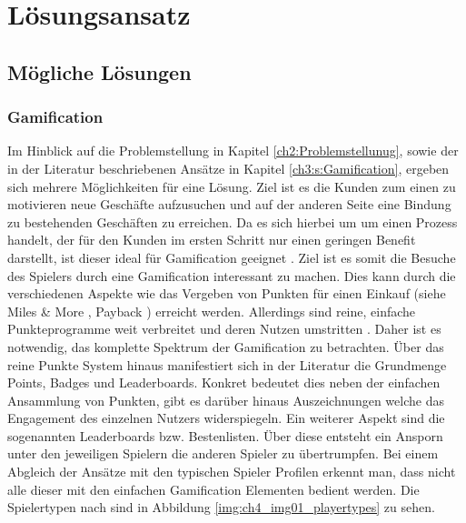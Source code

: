 \chapter{Lösungsansatz}
\label{ch:S4_Lösungsansatz}

\section{Mögliche Lösungen}
\label{ch4:s:Lösungen}

\subsection*{Gamification}


Im Hinblick auf die Problemstellung in Kapitel \ref{ch2:Problemstellunug}, sowie der in der Literatur beschriebenen Ansätze in Kapitel \ref{ch3:s:Gamification}, ergeben sich mehrere Möglichkeiten für eine Lösung. Ziel ist es die Kunden zum einen zu motivieren neue Geschäfte aufzusuchen und auf der anderen Seite eine Bindung zu bestehenden Geschäften zu erreichen. Da es sich hierbei um um einen Prozess handelt, der für den Kunden im ersten Schritt nur einen geringen Benefit darstellt, ist dieser ideal für Gamification geeignet \cite{Leigh.2012}. Ziel ist es somit die Besuche des Spielers durch eine Gamification interessant zu machen. Dies kann durch die verschiedenen Aspekte wie das Vergeben von Punkten für einen Einkauf (siehe Miles \& More \cite{Wagner.2005}, Payback \cite{Roesl.2005}) erreicht werden. Allerdings sind reine, einfache Punkteprogramme weit verbreitet und deren Nutzen umstritten \cite{Schmitt.2001}.
Daher ist es notwendig, das komplette Spektrum der Gamification zu betrachten.
Über das reine Punkte System hinaus manifestiert sich in der Literatur die Grundmenge \glqq Points, Badges und Leaderboards\grqq.
Konkret bedeutet dies neben der einfachen Ansammlung von Punkten, gibt es darüber hinaus Auszeichnungen welche das Engagement des einzelnen Nutzers widerspiegeln. Ein weiterer Aspekt sind die sogenannten Leaderboards bzw. Bestenlisten. Über diese entsteht ein Ansporn unter den jeweiligen Spielern die anderen Spieler zu übertrumpfen. Bei einem Abgleich der Ansätze mit den typischen Spieler Profilen erkennt man, dass nicht alle dieser mit den einfachen Gamification Elementen bedient werden. Die Spielertypen nach \textcite{Bartle.2004} sind in Abbildung \ref{img:ch4_img01_playertypes} zu sehen.

